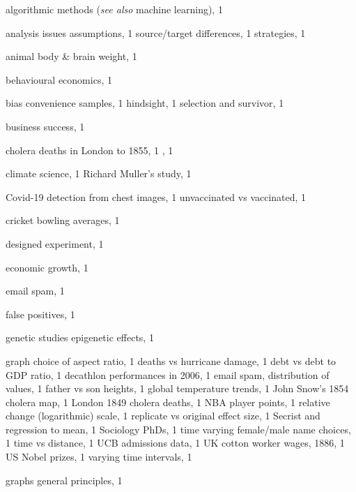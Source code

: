\documentclass[
  10pt,
  b5paper]{book}
\begin{document}
\newpage

\begin{theindex}

  \item algorithmic methods (\textit{see also} machine learning), 1
  \item analysis issues
    \subitem assumptions, 1
    \subitem source/target differences, 1
    \subitem strategies, 1
  \item animal body \& brain weight, 1

  \indexspace

  \item behavioural economics, 1
  \item bias
    \subitem convenience samples, 1
    \subitem hindsight, 1
    \subitem selection and survivor, 1
  \item business success, 1

  \indexspace

  \item cholera deaths in London
     to 1855, 1
    , 1
  \item climate science, 1
    \subitem Richard Muller's study, 1
  \item Covid-19
    \subitem detection from chest images, 1
    \subitem unvaccinated vs vaccinated, 1
  \item cricket bowling averages, 1

  \indexspace

  \item designed experiment, 1

  \indexspace

  \item economic growth, 1
  \item email spam, 1

  \indexspace

  \item false positives, 1

  \indexspace

  \item genetic studies
    \subitem epigenetic effects, 1
  \item graph
    \subitem choice of aspect ratio, 1
    \subitem deaths vs hurricane damage, 1
    \subitem debt vs debt to GDP ratio, 1
    \subitem decathlon performances in 2006, 1
    \subitem email spam, distribution of values, 1
    \subitem father vs son heights, 1
    \subitem global temperature trends, 1
    \subitem John Snow's 1854 cholera map, 1
    \subitem London 1849 cholera deaths, 1
    \subitem NBA player points, 1
    \subitem relative change (logarithmic) scale, 1
    \subitem replicate vs original effect size, 1
    \subitem Secrist and regression to mean, 1
    \subitem Sociology PhDs, 1
    \subitem time varying female/male name choices, 1
    \subitem time vs distance, 1
    \subitem UCB admissions data, 1
    \subitem UK cotton worker wages, 1886, 1
    \subitem US Nobel prizes, 1
    \subitem varying time intervals, 1
  \item graphs
    \subitem general principles, 1


\end{theindex}
\end{document}
